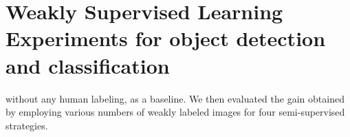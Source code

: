 \documentclass[letterpaper, 10 pt, conference]{ieeeconf}  %
\newcommand{\phil}[1]{\textcolor{blue}{#1}}
\begin{document}
\section{Weakly Supervised Learning Experiments for object detection and classification}\label{sec:w_exp}%
without any human labeling, as a baseline. We then evaluated the gain obtained by employing various numbers of weakly labeled images for four semi-supervised strategies. %
\end{document}
